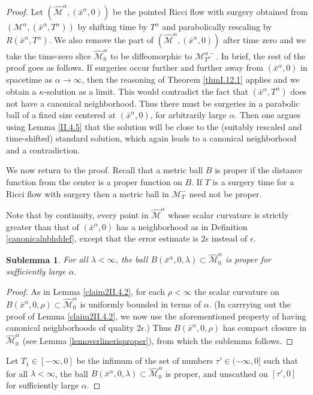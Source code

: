 \documentclass[12pt]{amsart}
\newcommand{\al}{\alpha}
\newcommand{\M}{{\mathcal M}}
\newcommand{\eps}{\epsilon}
\newcommand{\la}{\lambda}
\newcommand{\ra}{\rightarrow}
\numberwithin{equation}{section}
\theoremstyle{plain}
\newtheorem{sublemma}[equation]{Sublemma}
\theoremstyle{definition}
\theoremstyle{remark}
\begin{document}
\begin{proof}
Let $(\widehat\M^\al,(\bar x^\al,0))$ be the pointed Ricci flow
with surgery obtained from $(\M^\al,(\bar x^\al,T^\al))$
by shifting time by $T^\al$ and parabolically rescaling by
$R(\bar x^\al,T^\al)$.
We also remove the part of
$(\widehat\M^\al,(\bar x^\al,0))$ after time zero and
we take the time-zero slice $\widehat\M^\al_0$ to be
diffeomorphic to $\M^{\al -}_{T^\al}$.
In brief, the rest of the proof goes as follows.  If surgeries
occur further and further away from $(\bar x^\al,0)$
in spacetime as $\al\ra\infty$, then the reasoning of Theorem
\ref{thmI.12.1} applies and we obtain a $\kappa$-solution as a limit.
This would contradict the fact that $(\bar x^\al,T^\al)$ does
not have a canonical neighborhood.  Thus there must be 
surgeries in a parabolic ball of a fixed size centered
at $(\bar x^\al,0)$, for arbitrarily large $\al$. Then one
argues using 
Lemma \ref{II.4.5} that the solution will be close to
the (suitably rescaled and time-shifted) standard solution,
which again leads to a canonical neighborhood and a 
contradiction.

We now return to the proof.
Recall that a metric ball $B$ is
proper if the distance function from the center is a proper
function on $B$. If $T$ is a surgery time for a
Ricci flow with surgery then
a metric ball in $\M_T^-$ need not be proper.

Note that by continuity, 
every  point in $\widehat\M^\al$ whose scalar
curvature is strictly greater than that of $(\bar x^\al,0)$ has a
neighborhood as in Definition \ref{canonicalnbhddef}, except
that the error estimate
is $2 \epsilon$ instead of $\eps$.

\begin{sublemma}
For all $\la<\infty$,
the ball $B(\bar x^\al,0,\la)\subset\widehat\M^\al_0$
is proper for sufficiently
large $\al$.
\end{sublemma}
\begin{proof}
As in Lemma \ref{claim2II.4.2}, for each $\rho < \infty$ 
the scalar curvature on
$B(\bar x^\al, 0, \rho) \subset \widehat\M^{\al}_0$ 
is uniformly bounded in terms of $\al$.
(In carrrying out the proof of Lemma \ref{claim2II.4.2},
we now use the aforementioned property of having
canonical neighborhoods of quality $2\epsilon$.)
Thus $B(\bar x^\al, 0, \rho)$ has compact closure in
$\widehat\M^{\al}_0$
(see Lemma \ref{lemoverlinerisproper}), from which the sublemma follows.
\end{proof}

Let $T_1 \in [-\infty,0]$ be the infimum of the set of numbers
$\tau'\in (-\infty,0]$ such that for all $\la<\infty$,
the ball $B(\bar x^\al,0,\la)\subset\widehat\M^\al_0$
is proper,
and unscathed on $[\tau',0]$ for sufficiently
large $\al$.


\end{proof}
\end{document}
